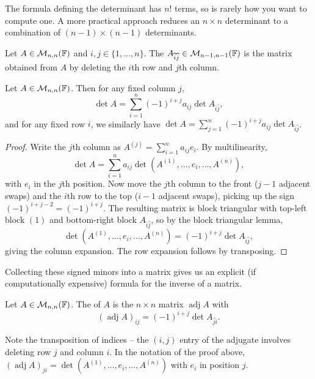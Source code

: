 \documentclass[a4paper]{scrartcl}
\newcommand{\adj}{\operatorname{adj}}
\begin{document}
The formula defining the determinant has $n!$ terms, so is rarely how you want to compute one. A more practical approach reduces an $n \times n$ determinant to a combination of $(n-1) \times (n-1)$ determinants.

\begin{definition}[Minor]
    Let $A \in \mathcal{M}_{n,n}(\mathbb{F})$ and $i, j \in \{1, \dots, n\}$. The  $A_{\widehat{i}\widehat{j}} \in \mathcal{M}_{n - 1, n-1}(\mathbb{F})$ is the matrix obtained from $A$ by deleting the $i$th row and $j$th column.
\end{definition}

\begin{lemma}
    Let $A \in \mathcal{M}_{n,n}(\mathbb{F})$. Then for any fixed column $j$,
    $$
    \det A = \sum_{i = 1}^n (-1)^{i + j} a_{ij} \det A_{\widehat{i}\widehat{j}},
    $$
    and for any fixed row $i$, we similarly have $\det A = \sum_{j = 1}^n (-1)^{i+j}a_{ij} \det A_{\widehat{i}\widehat{j}}$.
\end{lemma}
\begin{proof}
    Write the $j$th column as $A^{(j)} = \sum_{i = 1}^n a_{ij}e_i$. By multilinearity,
    $$
    \det A = \sum_{i = 1}^n a_{ij} \det (A^{(1)}, \dots, e_i, \dots, A^{(n)}),
    $$
    with $e_i$ in the $j$th position. Now move the $j$th column to the front ($j - 1$ adjacent swaps) and the $i$th row to the top ($i - 1$ adjacent swaps), picking up the sign $(-1)^{i + j - 2} = (-1)^{i+j}$. The resulting matrix is block triangular with top-left block $(1)$ and bottom-right block $A_{\widehat{i}\widehat{j}}$, so by the block triangular lemma,
    $$
    \det(A^{(1)}, \dots, e_i, \dots, A^{(n)}) = (-1)^{i + j}\det A_{\widehat{i}\widehat{j}},
    $$
    giving the column expansion. The row expansion follows by transposing.
\end{proof}

Collecting these signed minors into a matrix gives us an explicit (if computationally expensive) formula for the inverse of a matrix.

\begin{definition}[Adjugate]
    Let $A \in \mathcal{M}_{n,n}(\mathbb{F})$. The  of $A$ is the $n \times n$ matrix $\adj A$ with
    $$
    (\adj A)_{ij} = (-1)^{i + j} \det A_{\widehat{j}\widehat{i}}.
    $$
\end{definition}

Note the transposition of indices -- the $(i,j)$ entry of the adjugate involves deleting row $j$ and column $i$. In the notation of the proof above, $(\adj A)_{ji} = \det(A^{(1)}, \dots, e_i, \dots, A^{(n)})$ with $e_i$ in position $j$.
\end{document}

